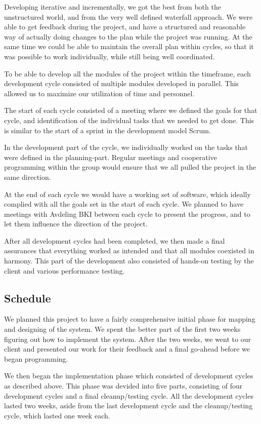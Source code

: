 Developing iterative and incrementally, we got the best from both the
unstructured world, and from the very well defined waterfall approach. We were
able to get feedback during the project, and have a structured and reasonable
way of actually doing changes to the plan while the project was running. At the
same time we could be able to maintain the overall plan within cycles, so that
it was possible to work individually, while still being well coordinated.

To be able to develop all the modules of the project within the timeframe, each development
cycle consisted of multiple modules developed in parallel. This allowed us to
maximize our utilization of time and personnel.

The start of each cycle consisted of a meeting where we defined the goals for
that cycle, and identification of the individual tasks that we needed to get
done. This is similar to the start of a sprint in the development model Scrum.

In the development part of the cycle, we individually worked on the tasks that
were defined in the planning-part. Regular meetings and cooperative programming within the group would
ensure that we all pulled the project in the same direction.

At the end of each cycle we would have a working set of software, which ideally
complied with all the goals set in the start of each cycle. We planned to
have meetings with Avdeling BKI between each cycle to present the progress, and
to let them influence the direction of the project.

After all development cycles had been completed, we then made a final
assurances that everything worked as intended and that all modules coexisted in
harmony. This part of the development also consisted of hands-on testing by the
client and various performance testing.

\subsection{Schedule}
We planned this project to have a fairly comprehensive initial phase for mapping
and designing of the system. We spent the better part of the first two weeks
figuring out how to implement the system. After the two weeks, we went to our
client and presented our work for their feedback and a final go-ahead before we
began programming.

We then began the implementation phase which consisted of development cycles as
described above. This phase was devided into five parts, consisting of four
development cycles and a final cleanup/testing cycle. All the development cycles
lasted two weeks, aside from the last development cycle and the cleanup/testing
cycle, which lasted one week each. 

